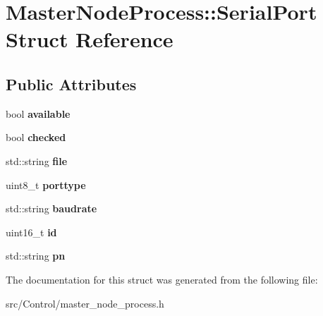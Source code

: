 \hypertarget{structMasterNodeProcess_1_1SerialPort}{}\section{Master\+Node\+Process\+:\+:Serial\+Port Struct Reference}
\label{structMasterNodeProcess_1_1SerialPort}
\subsection*{Public Attributes}
\begin{DoxyCompactItemize}
\item 
\mbox{\label{structMasterNodeProcess_1_1SerialPort_af199ad59bf1d9b12bc1ad5c4a6552363}} 
bool {\bfseries available}
\item 
\mbox{\label{structMasterNodeProcess_1_1SerialPort_ae88946fd28d0addbc34a55c8e6e0723f}} 
bool {\bfseries checked}
\item 
\mbox{\label{structMasterNodeProcess_1_1SerialPort_ab30d2bafc564974c24e5022f97d35278}} 
std\+::string {\bfseries file}
\item 
\mbox{\label{structMasterNodeProcess_1_1SerialPort_a5cf69f8e93ef6cddf6022e87e078561c}} 
uint8\+\_\+t {\bfseries porttype}
\item 
\mbox{\label{structMasterNodeProcess_1_1SerialPort_adba000a3331701054586969081c4f43d}} 
std\+::string {\bfseries baudrate}
\item 
\mbox{\label{structMasterNodeProcess_1_1SerialPort_a276fd33af7ee47edc0262c8170895f7c}} 
uint16\+\_\+t {\bfseries id}
\item 
\mbox{\label{structMasterNodeProcess_1_1SerialPort_a799f6f11c8d4850a790573d9e6ba7da3}} 
std\+::string {\bfseries pn}
\end{DoxyCompactItemize}


The documentation for this struct was generated from the following file\+:\begin{DoxyCompactItemize}
\item 
src/\+Control/master\+\_\+node\+\_\+process.\+h\end{DoxyCompactItemize}
